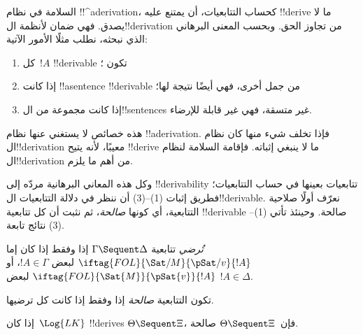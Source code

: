 \documentclass[../../../include/open-logic-section]{subfiles}
\begin{document}
      {}
      {}


\begin{explain}
السلامة في نظام !!^a{derivation}، كحساب التتابعيات، أن يمتنع عليه
!!{derive} ما لا يصدق. فهي ضمان لأنظمة ال!!{derivation} من تجاوز الحق.
وبحسب المعنى البرهاني الذي نبحثه، نطلب مثلًا الأمور الآتية:
\begin{enumerate}
\item كل~$!A$ !!{derivable} تكون ؛
\item إذا كانت !!a{sentence} !!{derivable} من جمل أخرى، فهي أيضًا
  نتيجة لها؛
\item إذا كانت مجموعة من ال!!{sentence}s غير متسقة، فهي غير قابلة
  للإرضاء.
\end{enumerate}
هذه خصائص لا يستغني عنها نظام !!a{derivation}. فإذا تخلف شيء منها كان نظام ال!!{derivation} معيبًا، لأنه يتيح
!!{derive} ما لا ينبغي إثباته. فإقامة السلامة لنظام ال!!{derivation} من أهم ما يلزم.

وكل هذه المعاني البرهانية مردّه إلى
!!{derivability} تتابعيات بعينها في حساب التتابعيات؛ فطريق إثبات
(1)--(3) أن ننظر في دلالة التتابعيات ال!!{derivable}.
نعرّف أولًا صلاحية التتابعية، أي كونها \emph{صالحة}، ثم نثبت أن كل تتابعية
!!{derivable} صالحة. وحينئذ تأتي (1)--(3) نتائج تابعة.
\end{explain}

\begin{defn}
 \emph{تُرضي} تتابعية
$\Gamma \Sequent \Delta$ إذا وفقط إذا كان إما
$\iftag{FOL}{\Sat/{M}}{\pSat/{v}}{!A}$ لبعض $!A \in \Gamma$، أو
$\iftag{FOL}{\Sat{M}}{\pSat{v}}{!A}$ لبعض $!A \in \Delta$.

تكون التتابعية \emph{صالحة} إذا وفقط إذا كانت كل
ترضيها.
\end{defn}

\begin{thm}[السلامة]
 إذا كان~$\Log{LK}$ !!{derive}s
$\Theta \Sequent \Xi$، فإن~$\Theta \Sequent \Xi$ صالحة.
\end{thm}
\end{document}
